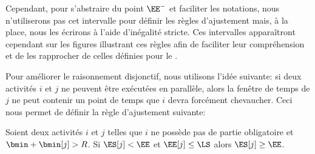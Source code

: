 Cependant, pour s'abstraire du point $\EE^{-}$ et faciliter les
notations, nous n'utiliserons pas cet intervalle pour définir les
règles d'ajustement mais, à la place, nous les écrirons à l'aide
d'inégalité stricte. Ces intervalles apparaîtront cependant sur les
figures illustrant ces règles afin de faciliter leur compréhension et
de les rapprocher de celles définies pour le \CUSP.

Pour améliorer le raisonnement disjonctif, nous utilisons l'idée
suivante: si deux activités $i$ et $j$ ne peuvent être exécutées en
parallèle, alors la fenêtre de temps de $j$ ne peut contenir un point
de temps que $i$ devra forcément chevaucher. Ceci nous permet de
définir la règle d'ajustement suivante:   

\begin{reg}
\label{reg:RDR_CECSP}
  Soient deux activités $i$ et $j$ telles que $i$ ne possède pas de
  partie obligatoire et $\bmin + \bmin[j] > R$. Si $\ES[j] < \EE$ et $
  \EE[j] \le \LS$ alors $\ES[j] \ge \EE$.
\end{reg}

